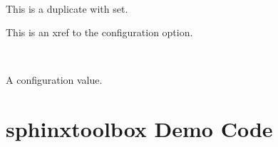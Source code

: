 \documentclass[letterpaper,10pt,english]{sphinxmanual}
\begin{document}
\begin{fulllineitems}
~
\vspace{-45px}

\begin{DUlineblock}{0em}
\item[]  
\end{DUlineblock}

\vspace{-25px}

This is a duplicate with  set.

\end{fulllineitems}


This is an xref to the {\hyperref[\detokenize{confval:confval-github_repository}]{}} configuration option.


\begin{fulllineitems}
\label{\detokenize{confval:confval-something}}~
\vspace{-25px}

A configuration value.

\end{fulllineitems}



\chapter{sphinx\sphinxhyphen{}toolbox Demo \sphinxhyphen{} Code}
\label{\detokenize{code-block:sphinx-toolbox-demo-code}}\label{\detokenize{code-block::doc}}
\begin{sphinxVerbatim}[commandchars=\\\{\}]
 
\end{sphinxVerbatim}

\begin{sphinxVerbatim}[commandchars=\\\{\}]
 
\end{sphinxVerbatim}
\end{document}
